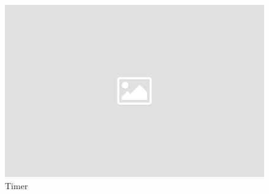 \noindent
\begin{figure}[ht]
	\centering
  \includegraphics[width=16cm]{pictures/placeholder.png}
	\caption{Timer}
	\label{pic/timer}
\end{figure}
